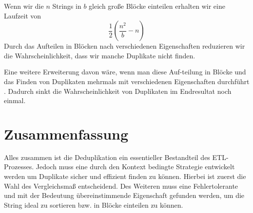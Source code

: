 \documentclass[sigconf]{acmart}
\begin{document}
Wenn wir die $n$ Strings in $b$ gleich große Blöcke
einteilen erhalten wir eine Laufzeit von
$$\frac{1}{2} (\frac{n^2}{b}-n)$$
Durch das Aufteilen in Blöcken nach verschiedenen
Eigenschaften reduzieren wir die Wahrscheinlichkeit,
dass wir manche Duplikate nicht finden.

Eine weitere Erweiterung davon wäre, wenn man diese
Auf-teilung in Blöcke und das Finden von Duplikaten
mehrmals mit verschiedenen Eigenschaften durchführt
\cite[Vlg. S. 11]{elmagarmid1}.
Dadurch sinkt die Wahrscheinlichkeit von Duplikaten
im Endresultat noch einmal.

\section*{Zusammenfassung}
Alles zusammen ist die Deduplikation ein essentieller 
Bestandteil des ETL-Prozesses.
Jedoch muss eine durch den Kontext bedingte Strategie entwickelt
werden um Duplikate sicher und effizient finden zu
können. Hierbei ist zuerst die Wahl des Vergleichsmaß
entscheidend. Des Weiteren muss eine Fehlertolerante
und mit der Bedeutung übereinstimmende Eigenschaft
gefunden werden, um die String ideal zu sortieren bzw. 
in Blöcke einteilen zu können.



\end{document}
